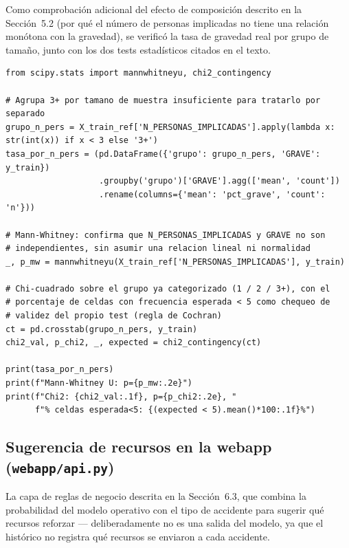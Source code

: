 \documentclass[11pt,a4paper]{article}
\begin{document}
Como comprobación adicional del efecto de composición descrito en la Sección~5.2 (por qué el número de personas implicadas no tiene una relación monótona con la gravedad), se verificó la tasa de gravedad real por grupo de tamaño, junto con los dos tests estadísticos citados en el texto.

\begin{lstlisting}[caption={Verificación estadística del efecto de composición entre número de personas implicadas y tipo de accidente.}]
from scipy.stats import mannwhitneyu, chi2_contingency

# Agrupa 3+ por tamano de muestra insuficiente para tratarlo por separado
grupo_n_pers = X_train_ref['N_PERSONAS_IMPLICADAS'].apply(lambda x: str(int(x)) if x < 3 else '3+')
tasa_por_n_pers = (pd.DataFrame({'grupo': grupo_n_pers, 'GRAVE': y_train})
                   .groupby('grupo')['GRAVE'].agg(['mean', 'count'])
                   .rename(columns={'mean': 'pct_grave', 'count': 'n'}))

# Mann-Whitney: confirma que N_PERSONAS_IMPLICADAS y GRAVE no son
# independientes, sin asumir una relacion lineal ni normalidad
_, p_mw = mannwhitneyu(X_train_ref['N_PERSONAS_IMPLICADAS'], y_train)

# Chi-cuadrado sobre el grupo ya categorizado (1 / 2 / 3+), con el
# porcentaje de celdas con frecuencia esperada < 5 como chequeo de
# validez del propio test (regla de Cochran)
ct = pd.crosstab(grupo_n_pers, y_train)
chi2_val, p_chi2, _, expected = chi2_contingency(ct)

print(tasa_por_n_pers)
print(f"Mann-Whitney U: p={p_mw:.2e}")
print(f"Chi2: {chi2_val:.1f}, p={p_chi2:.2e}, "
      f"% celdas esperada<5: {(expected < 5).mean()*100:.1f}%")
\end{lstlisting}

\subsection{Sugerencia de recursos en la webapp (\texttt{webapp/api.py})}
\label{app:recursos}

La capa de reglas de negocio descrita en la Sección~6.3, que combina la probabilidad del modelo operativo con el tipo de accidente para sugerir qué recursos reforzar --- deliberadamente no es una salida del modelo, ya que el histórico no registra qué recursos se enviaron a cada accidente.
\end{document}
